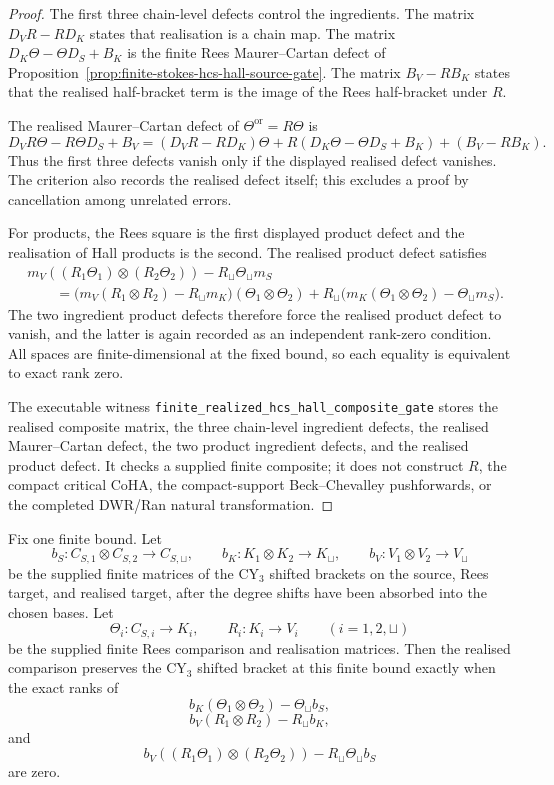\begin{proof}
The first three chain-level defects control the ingredients. The matrix
\(D_VR-RD_K\) states that realisation is a chain map. The matrix
\(D_K\Theta-\Theta D_S+B_K\) is the finite Rees Maurer--Cartan defect
of Proposition~\ref{prop:finite-stokes-hcs-hall-source-gate}. The
matrix \(B_V-RB_K\) states that the realised half-bracket term is the
image of the Rees half-bracket under \(R\).

The realised Maurer--Cartan defect of \(\Theta^{\mathrm{or}}=R\Theta\)
is
\[
 D_VR\Theta-R\Theta D_S+B_V
 =
 (D_VR-RD_K)\Theta
 +R(D_K\Theta-\Theta D_S+B_K)
 +(B_V-RB_K).
\]
Thus the first three defects vanish only if the displayed realised
defect vanishes. The criterion also records the realised defect itself;
this excludes a proof by cancellation among unrelated errors.

For products, the Rees square is the first displayed product defect and
the realisation of Hall products is the second. The realised product
defect satisfies
\[
\begin{aligned}
&m_V((R_1\Theta_1)\otimes(R_2\Theta_2))
 -R_\sqcup\Theta_\sqcup m_S\\
&\qquad =
\bigl(m_V(R_1\otimes R_2)-R_\sqcup m_K\bigr)
(\Theta_1\otimes\Theta_2)
 +R_\sqcup\bigl(m_K(\Theta_1\otimes\Theta_2)-\Theta_\sqcup m_S\bigr).
\end{aligned}
\]
The two ingredient product defects therefore force the realised product
defect to vanish, and the latter is again recorded as an independent
rank-zero condition. All spaces are finite-dimensional at the fixed
bound, so each equality is equivalent to exact rank zero.

The executable witness
\texttt{finite\_realized\_hcs\_hall\_composite\_gate} stores the
realised composite matrix, the three chain-level ingredient defects,
the realised Maurer--Cartan defect, the two product ingredient defects,
and the realised product defect. It checks a supplied finite composite;
it does not construct \(R\), the compact critical CoHA, the
compact-support Beck--Chevalley pushforwards, or the completed DWR/Ran
natural transformation.
\end{proof}

\begin{proposition}
\label{prop:finite-realized-cy3-shifted-bracket-gate}
\ClaimStatusProvedHere
Fix one finite bound. Let
\[
 b_S\colon C_{S,1}\otimes C_{S,2}\to C_{S,\sqcup},\qquad
 b_K\colon K_1\otimes K_2\to K_\sqcup,\qquad
 b_V\colon V_1\otimes V_2\to V_\sqcup
\]
be the supplied finite matrices of the CY$_3$ shifted brackets on the
source, Rees target, and realised target, after the degree shifts have
been absorbed into the chosen bases. Let
\[
 \Theta_i\colon C_{S,i}\to K_i,\qquad
 R_i\colon K_i\to V_i
 \qquad (i=1,2,\sqcup)
\]
be the supplied finite Rees comparison and realisation matrices. Then
the realised comparison preserves the CY$_3$ shifted bracket at this
finite bound exactly when the exact ranks of
\[
 b_K(\Theta_1\otimes\Theta_2)-\Theta_\sqcup b_S,
\]
\[
 b_V(R_1\otimes R_2)-R_\sqcup b_K,
\]
and
\[
 b_V((R_1\Theta_1)\otimes(R_2\Theta_2))
 -R_\sqcup\Theta_\sqcup b_S
\]
are zero.
\end{proposition}

